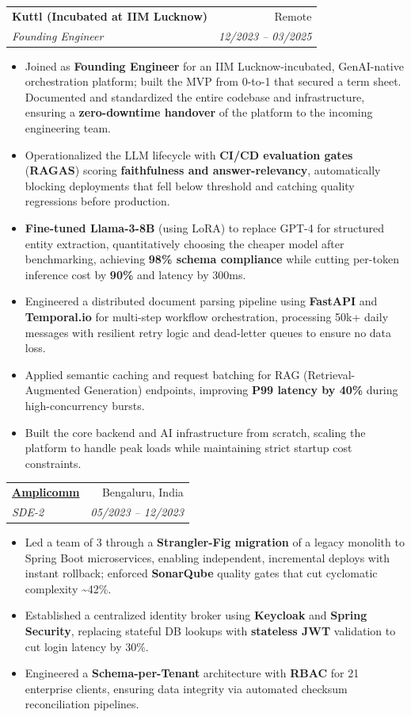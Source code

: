 \documentclass[11pt,a4paper]{article}
\makeatletter
\newcommand{\resumeItem}[1]{
  \item\small{
    {#1 \vspace{-2pt}}
  }
}
\newcommand{\resumeSubheading}[4]{
  \vspace{-1pt}\item
    \begin{tabular*}{0.97\textwidth}[t]{l@{\extracolsep{\fill}}r}
      \textbf{#1} & #2 \\
      \textit{\small#3} & \textit{\small #4} \\
    \end{tabular*}\vspace{-5pt}
}
\newcommand{\resumeItemListStart}{\begin{itemize}[itemsep=2pt, topsep=0pt, partopsep=0pt]}
\newcommand{\resumeItemListEnd}{\end{itemize}\vspace{-5pt}}
\makeatother
\begin{document}
    \resumeSubheading
      {Kuttl (Incubated at IIM Lucknow)}{Remote}
      {Founding Engineer}{12/2023 -- 03/2025}
      \resumeItemListStart
        \resumeItem{Joined as \textbf{Founding Engineer} for an IIM Lucknow-incubated, GenAI-native orchestration platform; built the MVP from 0-to-1 that secured a term sheet. Documented and standardized the entire codebase and infrastructure, ensuring a \textbf{zero-downtime handover} of the platform to the incoming engineering team.}
        \resumeItem{Operationalized the LLM lifecycle with \textbf{CI/CD evaluation gates} (\textbf{RAGAS}) scoring \textbf{faithfulness and answer-relevancy}, automatically blocking deployments that fell below threshold and catching quality regressions before production.}
        \resumeItem{\textbf{Fine-tuned Llama-3-8B} (using LoRA) to replace GPT-4 for structured entity extraction, quantitatively choosing the cheaper model after benchmarking, achieving \textbf{98\% schema compliance} while cutting per-token inference cost by \textbf{90\%} and latency by 300ms.}
        \resumeItem{Engineered a distributed document parsing pipeline using \textbf{FastAPI} and \textbf{Temporal.io} for multi-step workflow orchestration, processing 50k+ daily messages with resilient retry logic and dead-letter queues to ensure no data loss.}
        \resumeItem{Applied semantic caching and request batching for RAG (Retrieval-Augmented Generation) endpoints, improving \textbf{P99 latency by 40\%} during high-concurrency bursts.}
        \resumeItem{Built the core backend and AI infrastructure from scratch, scaling the platform to handle peak loads while maintaining strict startup cost constraints.}
      \resumeItemListEnd

    \resumeSubheading
      {\href{https://amplicomm.com/}{Amplicomm}}{Bengaluru, India}
      {SDE-2}{05/2023 -- 12/2023}
      \resumeItemListStart
        \resumeItem{Led a team of 3 through a \textbf{Strangler-Fig migration} of a legacy monolith to Spring Boot microservices, enabling independent, incremental deploys with instant rollback; enforced \textbf{SonarQube} quality gates that cut cyclomatic complexity \textasciitilde{}42\%.}
        \resumeItem{Established a centralized identity broker using \textbf{Keycloak} and \textbf{Spring Security}, replacing stateful DB lookups with \textbf{stateless JWT} validation to cut login latency by 30\%.}
        \resumeItem{Engineered a \textbf{Schema-per-Tenant} architecture with \textbf{RBAC} for 21 enterprise clients, ensuring data integrity via automated checksum reconciliation pipelines.}
      \resumeItemListEnd
\end{document}
